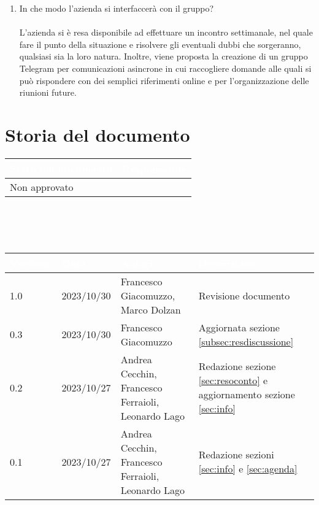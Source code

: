 \documentclass[12pt]{article}
\begin{document}
\begin{enumerate}
    \item In che modo l'azienda si interfaccerà con il gruppo?\\ \\
L'azienda si è resa disponibile ad effettuare un incontro settimanale, nel quale fare il punto della situazione e risolvere gli eventuali dubbi che sorgeranno, qualsiasi sia la loro natura. Inoltre, viene proposta la creazione di un gruppo Telegram per comunicazioni asincrone in cui raccogliere domande alle quali si può rispondere con dei semplici riferimenti online e per l'organizzazione delle riunioni future.

\end{enumerate}

\section{Storia del documento} \label{sec:storia}
\begingroup
\setlength{\tabcolsep}{10pt}
\renewcommand{\arraystretch}{1.5}
\begin{tabularx}{\textwidth}{| X | X |}
    \hline
    \rowcolor{headerrow} \textbf{\textcolor{white}{Stato del documento}} & \textbf{\textcolor{white}{Responsabile}} \\
    \hline
    Non approvato &\\
    \hline   
\end{tabularx}
\\\\\\
\begin{tabularx}{\textwidth}{| l | l | X | X |}
    \hline
    \rowcolor{headerrow} \textbf{\textcolor{white}{Versione}} & \textbf{\textcolor{white}{Data}} & \textbf{\textcolor{white}{Autori}} & \textbf{\textcolor{white}{Descrizione}} \\
    \hline
    1.0 & 2023/10/30 & Francesco Giacomuzzo, Marco Dolzan & Revisione documento\\
    \hline  
    0.3 & 2023/10/30 & Francesco Giacomuzzo  & Aggiornata sezione \ref{subsec:resdiscussione} \\
    \hline
    0.2 & 2023/10/27 & Andrea Cecchin, Francesco Ferraioli, Leonardo Lago & Redazione sezione \ref{sec:resoconto} e aggiornamento sezione \ref{sec:info}\\
    \hline
    0.1 & 2023/10/27 & Andrea Cecchin, Francesco Ferraioli, Leonardo Lago  & Redazione sezioni \ref{sec:info} e \ref{sec:agenda}\\
    \hline   
\end{tabularx}
\endgroup
\end{document}
